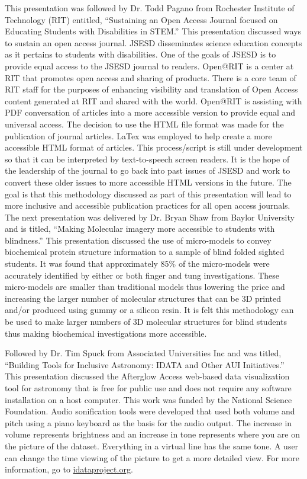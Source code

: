 \documentclass[11pt]{sig-alternate}
\begin{document}
\begin{large}
This presentation was followed by Dr. Todd Pagano from Rochester Institute of Technology (RIT) entitled, “Sustaining an Open Access Journal focused on Educating Students with Disabilities in STEM.” This presentation discussed ways to sustain an open access journal. JSESD disseminates science education concepts as it pertains to students with disabilities. One of the goals of JSESD is to provide equal access to the JSESD journal to readers. Open@RIT is a center at RIT that promotes open access and sharing of products. There is a core team of RIT staff for the purposes of enhancing visibility and translation of Open Access content generated at RIT and shared with the world. Open@RIT is assisting with PDF conversation of articles into a more accessible version to provide equal and universal access. The decision to use the HTML file format was made for the publication of journal articles. LaTex was employed to help create a more accessible HTML format of articles. This process/script is still under development so that it can be interpreted by text-to-speech screen readers. It is the hope of the leadership of the journal to go back into past issues of JSESD and work to convert these older issues to more accessible HTML versions in the future. The goal is that this methodology discussed as part of this presentation will lead to more inclusive and accessible publication practices for all open access journals.\\

The next presentation was delivered by Dr. Bryan Shaw from Baylor University and is titled, “Making Molecular imagery more accessible to students with blindness.” This presentation discussed the use of micro-models to convey biochemical protein structure information to a sample of blind folded sighted students. It was found that approximately 85\% of the micro-models were accurately identified by either or both finger and tung investigations. The\-se micro-models are smaller than traditional models thus lowering the price and increasing the larger number of molecular structures that can be 3D printed and/or produced using gummy or a silicon resin. It is felt this methodology can be used to make larger numbers of 3D molecular structures for blind students thus making biochemical investigations more accessible.

Followed by Dr. Tim Spuck from Associated Universities Inc and was titled, “Building Tools for Inclusive Astronomy: IDATA and Other AUI Initiatives.” This presentation discussed the Afterglow Access web-based data visualization tool for astronomy that is free for public use and does not require any software installation on a host computer. This work was funded by the National Science Foundation. Audio sonification tools were developed that used both volume and pitch using a piano keyboard as the basis for the audio output. The increase in volume represents brightness and an increase in tone represents where you are on the picture of the dataset. Everything in a virtual line has the same tone. A user can change the time viewing of the picture to get a more detailed view. For more information, go to \url{idataproject.org}.\\


\end{large}
\end{document}
